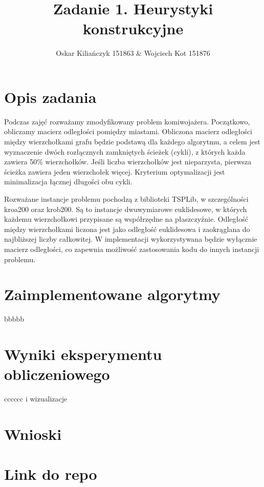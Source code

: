 \documentclass[11pt]{article}
\title{Zadanie 1. Heurystyki konstrukcyjne}
\author{Oskar Kiliańczyk 151863 \& Wojciech Kot 151876}
\date{}
\begin{document}
\maketitle
\newpage

\section{Opis zadania}\label{sec:opis-zadania}

Podczas zajęć rozważamy zmodyfikowany problem komiwojażera.
Początkowo, obliczamy macierz odległości pomiędzy miastami.
Obliczona macierz odległości między wierzchołkami grafu będzie podstawą dla każdego algorytmu,
a celem jest wyznaczenie dwóch rozłącznych zamkniętych ścieżek (cykli), z których każda zawiera 50\% wierzchołków.
Jeśli liczba wierzchołków jest nieparzysta, pierwsza ścieżka zawiera jeden wierzchołek więcej.
Kryterium optymalizacji jest minimalizacja łącznej długości obu cykli.

Rozważane instancje problemu pochodzą z biblioteki TSPLib, w szczególności kroa200 oraz krob200.
Są to instancje dwuwymiarowe euklidesowe, w których każdemu wierzchołkowi przypisane są współrzędne na płaszczyźnie.
Odległość między wierzchołkami liczona jest jako odległość euklidesowa i zaokrąglana do najbliższej liczby całkowitej.
W implementacji wykorzystywana będzie wyłącznie macierz odległości, co zapewnia możliwość zastosowania kodu do innych instancji problemu.

\section{Zaimplementowane algorytmy}\label{sec:zaimplementowane-algorytmy}

bbbbb

\section{Wyniki eksperymentu obliczeniowego}\label{sec:wyniki-eksperymenty-obliczeniowego}

cccccc i wizualizacje

\section{Wnioski}\label{sec:wnioski}

\section{Link do repo}\label{sec:link-do-repo}
\end{document}
